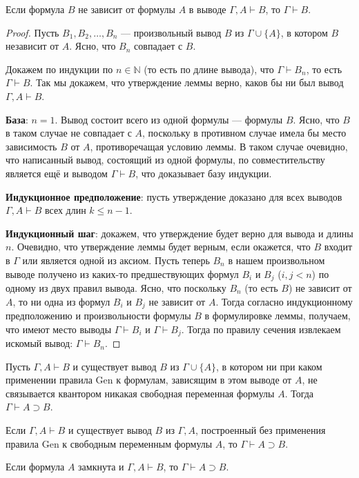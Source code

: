 \begin{lemma}
    Если формула $B$ не зависит от формулы $A$ в выводе $\Gamma, A \vdash B$, то $\Gamma \vdash B$.
\end{lemma}
\begin{proof}
    Пусть $B_1, B_2, \dots, B_n$ --- произвольный вывод $B$ из $\Gamma \cup \{A\}$, в котором $B$ независит от $A$. Ясно, что $B_n$ совпадает с $B$.

    Докажем по индукции по $n \in \mathbb{N}$ (то есть по длине вывода), что $\Gamma \vdash B_n$, то есть $\Gamma \vdash B$. Так мы докажем, что утверждение леммы верно, каков бы ни был вывод $\Gamma, A \vdash B$.

    \textbf{База}: $n = 1$. Вывод состоит всего из одной формулы --- формулы $B$. Ясно, что $B$ в таком случае не совпадает с $A$, поскольку в противном случае имела бы место зависимость $B$ от $A$, противоречащая условию леммы. В таком случае очевидно, что написанный вывод, состоящий из одной формулы, по совместительству является ещё и выводом $\Gamma \vdash B$, что доказывает базу индукции.

    \textbf{Индукционное предположение}: пусть утверждение доказано для всех выводов $\Gamma, A \vdash B$ всех длин $k \leqslant n - 1$.

    \textbf{Индукционный шаг}: докажем, что утверждение будет верно для вывода и длины $n$. Очевидно, что утверждение леммы будет верным, если окажется, что $B$ входит в $\Gamma$ или является одной из аксиом. Пусть теперь $B_n$ в нашем произвольном выводе получено из каких-то предшествующих формул $B_i$ и $B_j$ ($i, j < n$) по одному из двух правил вывода. Ясно, что поскольку $B_n$ (то есть $B$) не зависит от $A$, то ни одна из формул $B_i$ и $B_j$ не зависит от $A$. Тогда согласно индукционному предположению и произвольности формулы $B$ в формулировке леммы, получаем, что имеют место выводы $\Gamma \vdash B_i$ и $\Gamma \vdash B_j$. Тогда по правилу сечения извлекаем искомый вывод: $\Gamma \vdash B_n$.
\end{proof}

\begin{theorem}
    Пусть $\Gamma, A \vdash B$ и существует вывод $B$ из $\Gamma \cup \{A\}$, в котором ни при каком применении правила Gen к формулам, зависящим в этом выводе от $A$, не связывается квантором никакая свободная переменная формулы $A$. Тогда $\Gamma \vdash A \supset B$.
\end{theorem}

\begin{corollary}
    Если $\Gamma, A \vdash B$ и существует вывод $B$ из $\Gamma, A$, построенный без применения правила Gen к свободным переменным формулы $A$, то $\Gamma \vdash A \supset B$.
\end{corollary}

\begin{corollary}
    Если формула $A$ замкнута и $\Gamma, A \vdash B$, то $\Gamma \vdash A \supset B$.
\end{corollary}